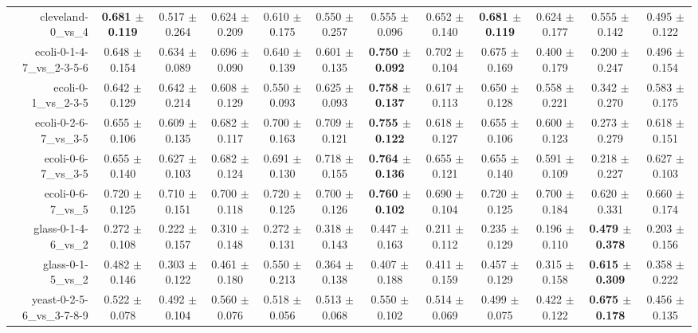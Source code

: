 \begin{table}[!ht]
{\begin{tabular}{r c c c c c c c c c c c}
cleveland-0\_vs\_4 & \textbf{0.681 $\pm$ 0.119} & 0.517 $\pm$ 0.264 & 0.624 $\pm$ 0.209 & 0.610 $\pm$ 0.175 & 0.550 $\pm$ 0.257 & 0.555 $\pm$ 0.096 & 0.652 $\pm$ 0.140 & \textbf{0.681 $\pm$ 0.119} & 0.624 $\pm$ 0.177 & 0.555 $\pm$ 0.142 & 0.495 $\pm$ 0.122 \\
ecoli-0-1-4-7\_vs\_2-3-5-6 & 0.648 $\pm$ 0.154 & 0.634 $\pm$ 0.089 & 0.696 $\pm$ 0.090 & 0.640 $\pm$ 0.139 & 0.601 $\pm$ 0.135 & \textbf{0.750 $\pm$ 0.092} & 0.702 $\pm$ 0.104 & 0.675 $\pm$ 0.169 & 0.400 $\pm$ 0.179 & 0.200 $\pm$ 0.247 & 0.496 $\pm$ 0.154 \\
ecoli-0-1\_vs\_2-3-5 & 0.642 $\pm$ 0.129 & 0.642 $\pm$ 0.214 & 0.608 $\pm$ 0.129 & 0.550 $\pm$ 0.093 & 0.625 $\pm$ 0.093 & \textbf{0.758 $\pm$ 0.137} & 0.617 $\pm$ 0.113 & 0.650 $\pm$ 0.128 & 0.558 $\pm$ 0.221 & 0.342 $\pm$ 0.270 & 0.583 $\pm$ 0.175 \\
ecoli-0-2-6-7\_vs\_3-5 & 0.655 $\pm$ 0.106 & 0.609 $\pm$ 0.135 & 0.682 $\pm$ 0.117 & 0.700 $\pm$ 0.163 & 0.709 $\pm$ 0.121 & \textbf{0.755 $\pm$ 0.122} & 0.618 $\pm$ 0.127 & 0.655 $\pm$ 0.106 & 0.600 $\pm$ 0.123 & 0.273 $\pm$ 0.279 & 0.618 $\pm$ 0.151 \\
ecoli-0-6-7\_vs\_3-5 & 0.655 $\pm$ 0.140 & 0.627 $\pm$ 0.103 & 0.682 $\pm$ 0.124 & 0.691 $\pm$ 0.130 & 0.718 $\pm$ 0.155 & \textbf{0.764 $\pm$ 0.136} & 0.655 $\pm$ 0.121 & 0.655 $\pm$ 0.140 & 0.591 $\pm$ 0.109 & 0.218 $\pm$ 0.227 & 0.627 $\pm$ 0.103 \\
ecoli-0-6-7\_vs\_5 & 0.720 $\pm$ 0.125 & 0.710 $\pm$ 0.151 & 0.700 $\pm$ 0.118 & 0.720 $\pm$ 0.125 & 0.700 $\pm$ 0.126 & \textbf{0.760 $\pm$ 0.102} & 0.690 $\pm$ 0.104 & 0.720 $\pm$ 0.125 & 0.700 $\pm$ 0.184 & 0.620 $\pm$ 0.331 & 0.660 $\pm$ 0.174 \\
glass-0-1-4-6\_vs\_2 & 0.272 $\pm$ 0.108 & 0.222 $\pm$ 0.157 & 0.310 $\pm$ 0.148 & 0.272 $\pm$ 0.131 & 0.318 $\pm$ 0.143 & 0.447 $\pm$ 0.163 & 0.211 $\pm$ 0.112 & 0.235 $\pm$ 0.129 & 0.196 $\pm$ 0.110 & \textbf{0.479 $\pm$ 0.378} & 0.203 $\pm$ 0.156 \\
glass-0-1-5\_vs\_2 & 0.482 $\pm$ 0.146 & 0.303 $\pm$ 0.122 & 0.461 $\pm$ 0.180 & 0.550 $\pm$ 0.213 & 0.364 $\pm$ 0.138 & 0.407 $\pm$ 0.188 & 0.411 $\pm$ 0.159 & 0.457 $\pm$ 0.129 & 0.315 $\pm$ 0.158 & \textbf{0.615 $\pm$ 0.309} & 0.358 $\pm$ 0.222 \\
yeast-0-2-5-6\_vs\_3-7-8-9 & 0.522 $\pm$ 0.078 & 0.492 $\pm$ 0.104 & 0.560 $\pm$ 0.076 & 0.518 $\pm$ 0.056 & 0.513 $\pm$ 0.068 & 0.550 $\pm$ 0.102 & 0.514 $\pm$ 0.069 & 0.499 $\pm$ 0.075 & 0.422 $\pm$ 0.122 & \textbf{0.675 $\pm$ 0.178} & 0.456 $\pm$ 0.135 \\

\end{tabular}}
\end{table}
